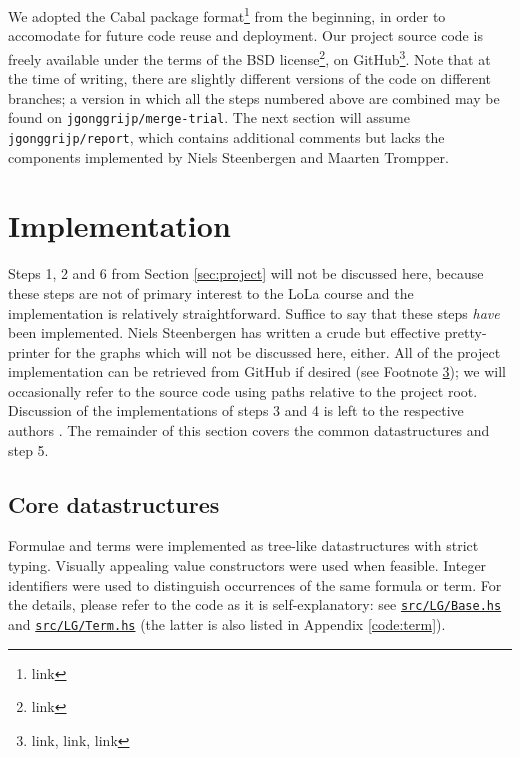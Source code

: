 \documentclass[12pt,a4paper]{article}
\newcommand{\coderef}[1]{\href{https://github.com/jgonggrijp/net-prove/blob/report/#1}{\texttt{#1}}}
\begin{document}
We adopted the Cabal package format\footnote{link} from the beginning, in order to accomodate for future code reuse and deployment. Our project source code is freely available under the terms of the BSD license\footnote{link}, on GitHub\footnote{link, link, link\label{ftn:github}}. Note that at the time of writing, there are slightly different versions of the code on different branches; a version in which all the steps numbered above are combined may be found on \texttt{jgonggrijp/merge-trial}. The next section will assume \texttt{jgonggrijp/report}, which contains additional comments but lacks the components implemented by Niels Steenbergen and Maarten Trompper.


\section{Implementation}

Steps 1, 2 and 6 from Section \ref{sec:project} will not be discussed here, because these steps are not of primary interest to the LoLa course and the implementation is relatively straightforward. Suffice to say that these steps \emph{have} been implemented. Niels Steenbergen has written a crude but effective pretty-printer for the graphs which will not be discussed here, either. All of the project implementation can be retrieved from GitHub if desired (see Footnote \ref{ftn:github}); we will occasionally refer to the source code using paths relative to the project root. Discussion of the implementations of steps 3 and 4 is left to the respective authors \cite{maarten,niels}. The remainder of this section covers the common datastructures and step 5.


\subsection{Core datastructures}

Formulae and terms were implemented as tree-like datastructures with strict typing. Visually appealing value constructors were used when feasible. Integer identifiers were used to distinguish occurrences of the same formula or term. For the details, please refer to the code as it is self-explanatory: see \coderef{src/LG/Base.hs} and \coderef{src/LG/Term.hs} (the latter is also listed in Appendix \ref{code:term}).
\end{document}
